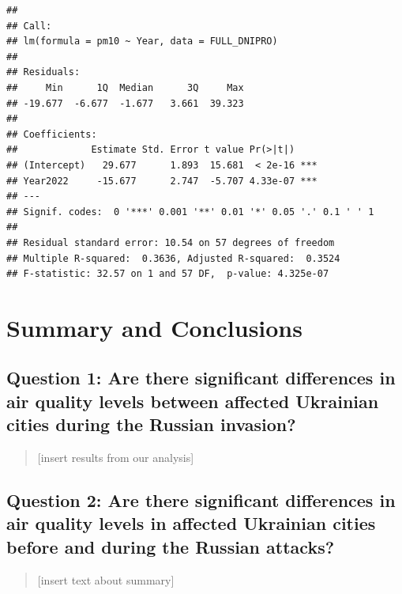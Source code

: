\documentclass[
  12pt,
]{article}
\begin{document}
\begin{verbatim}
## 
## Call:
## lm(formula = pm10 ~ Year, data = FULL_DNIPRO)
## 
## Residuals:
##     Min      1Q  Median      3Q     Max 
## -19.677  -6.677  -1.677   3.661  39.323 
## 
## Coefficients:
##             Estimate Std. Error t value Pr(>|t|)    
## (Intercept)   29.677      1.893  15.681  < 2e-16 ***
## Year2022     -15.677      2.747  -5.707 4.33e-07 ***
## ---
## Signif. codes:  0 '***' 0.001 '**' 0.01 '*' 0.05 '.' 0.1 ' ' 1
## 
## Residual standard error: 10.54 on 57 degrees of freedom
## Multiple R-squared:  0.3636, Adjusted R-squared:  0.3524 
## F-statistic: 32.57 on 1 and 57 DF,  p-value: 4.325e-07
\end{verbatim}

\newpage

\hypertarget{summary-and-conclusions}{%
\section{Summary and Conclusions}\label{summary-and-conclusions}}

\hypertarget{question-1-are-there-significant-differences-in-air-quality-levels-between-affected-ukrainian-cities-during-the-russian-invasion-1}{%
\subsection{Question 1: Are there significant differences in air quality
levels between affected Ukrainian cities during the Russian
invasion?}\label{question-1-are-there-significant-differences-in-air-quality-levels-between-affected-ukrainian-cities-during-the-russian-invasion-1}}

\begin{quote}
{[}insert results from our analysis{]}
\end{quote}

\hypertarget{question-2-are-there-significant-differences-in-air-quality-levels-in-affected-ukrainian-cities-before-and-during-the-russian-attacks-1}{%
\subsection{Question 2: Are there significant differences in air quality
levels in affected Ukrainian cities before and during the Russian
attacks?}\label{question-2-are-there-significant-differences-in-air-quality-levels-in-affected-ukrainian-cities-before-and-during-the-russian-attacks-1}}

\begin{quote}
{[}insert text about summary{]}
\end{quote}
\end{document}
